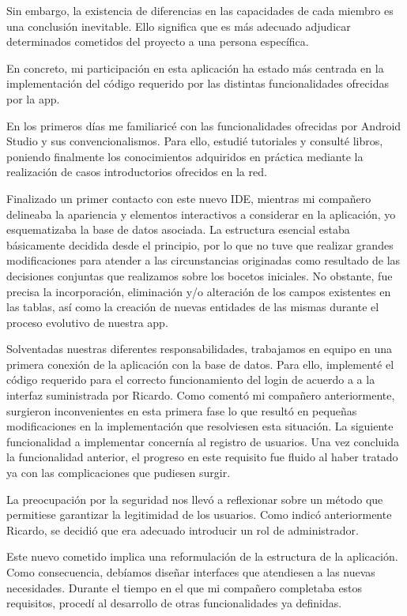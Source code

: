 \documentclass[11pt,spanish,
		listoftables,listoffigures]
		{tfgplantilla}
\begin{document}
Sin embargo, la existencia de diferencias en las capacidades de cada miembro es una conclusión inevitable. Ello significa que es más adecuado adjudicar determinados cometidos del proyecto a una persona específica.

En concreto, mi participación en esta aplicación ha estado más centrada en la implementación del código requerido por las distintas funcionalidades ofrecidas por la app.

En los primeros días me familiaricé con las funcionalidades ofrecidas por Android Studio y sus convencionalismos. Para ello, estudié tutoriales y consulté libros, poniendo finalmente los conocimientos adquiridos en práctica mediante la realización de casos introductorios ofrecidos en la red.

Finalizado un primer contacto con este nuevo IDE, mientras mi compañero delineaba la apariencia y elementos interactivos a considerar en la aplicación, yo esquematizaba la base de datos asociada. La estructura esencial estaba básicamente decidida desde el principio, por lo que no tuve que realizar grandes modificaciones para atender a las circunstancias originadas como resultado de las decisiones conjuntas que realizamos sobre los bocetos iniciales. No obstante, fue precisa la incorporación, eliminación y/o alteración de los campos existentes en las tablas, así como la creación de nuevas entidades de las mismas durante el proceso evolutivo de nuestra app. 

Solventadas nuestras diferentes responsabilidades, trabajamos en equipo en una primera conexión de la aplicación con la base de datos. Para ello, implementé el código requerido para el correcto funcionamiento del login de acuerdo a a la interfaz suministrada por Ricardo. Como comentó mi compañero anteriormente, surgieron inconvenientes en esta primera fase lo que resultó en pequeñas modificaciones en la implementación que resolviesen esta situación.
La siguiente funcionalidad a implementar concernía al registro de usuarios. Una vez concluida la funcionalidad anterior, el progreso en este requisito fue fluido al haber tratado ya con las complicaciones que pudiesen surgir.

La preocupación por la seguridad nos llevó a reflexionar sobre un método que permitiese garantizar la legitimidad de los usuarios. Como indicó anteriormente Ricardo, se decidió que era adecuado introducir un rol de administrador.

Este nuevo cometido implica una reformulación de la estructura de la aplicación. Como consecuencia, debíamos diseñar interfaces que atendiesen a las nuevas necesidades. Durante el tiempo en el que mi compañero completaba estos requisitos, procedí al desarrollo de otras funcionalidades ya definidas.
\end{document}
